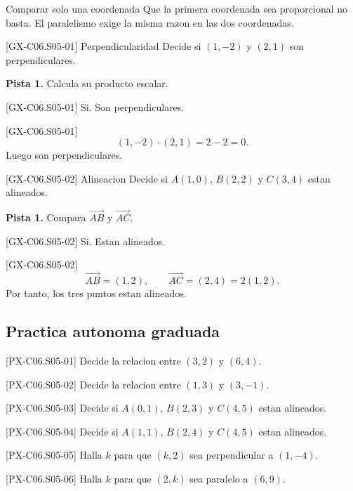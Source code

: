\begin{commonerror}{Comparar solo una coordenada}
Que la primera coordenada sea proporcional no basta. El paralelismo exige la misma razon en las
dos coordenadas.
\end{commonerror}

\begin{guidedexercise}{[GX-C06.S05-01] Perpendicularidad}
Decide si \((1,-2)\) y \((2,1)\) son perpendiculares.

\textbf{Pista 1.} Calcula su producto escalar.
\end{guidedexercise}

\begin{shortanswer}{[GX-C06.S05-01]}
Si. Son perpendiculares.
\end{shortanswer}

\begin{fullsolution}{[GX-C06.S05-01]}
\[
(1,-2)\cdot (2,1)=2-2=0.
\]
Luego son perpendiculares.
\end{fullsolution}

\begin{guidedexercise}{[GX-C06.S05-02] Alineacion}
Decide si \(A(1,0)\), \(B(2,2)\) y \(C(3,4)\) estan alineados.

\textbf{Pista 1.} Compara \(\overrightarrow{AB}\) y \(\overrightarrow{AC}\).
\end{guidedexercise}

\begin{shortanswer}{[GX-C06.S05-02]}
Si. Estan alineados.
\end{shortanswer}

\begin{fullsolution}{[GX-C06.S05-02]}
\[
\overrightarrow{AB}=(1,2),
\qquad
\overrightarrow{AC}=(2,4)=2(1,2).
\]
Por tanto, los tres puntos estan alineados.
\end{fullsolution}

\subsection*{Practica autonoma graduada}
\begin{exercise}{[PX-C06.S05-01] Decide la relacion entre \((3,2)\) y \((6,4)\).}
\end{exercise}
\begin{exercise}{[PX-C06.S05-02] Decide la relacion entre \((1,3)\) y \((3,-1)\).}
\end{exercise}
\begin{exercise}{[PX-C06.S05-03] Decide si \(A(0,1)\), \(B(2,3)\) y \(C(4,5)\) estan alineados.}
\end{exercise}
\begin{exercise}{[PX-C06.S05-04] Decide si \(A(1,1)\), \(B(2,4)\) y \(C(4,5)\) estan alineados.}
\end{exercise}
\begin{exercise}{[PX-C06.S05-05] Halla \(k\) para que \((k,2)\) sea perpendicular a \((1,-4)\).}
\end{exercise}
\begin{exercise}{[PX-C06.S05-06] Halla \(k\) para que \((2,k)\) sea paralelo a \((6,9)\).}
\end{exercise}

